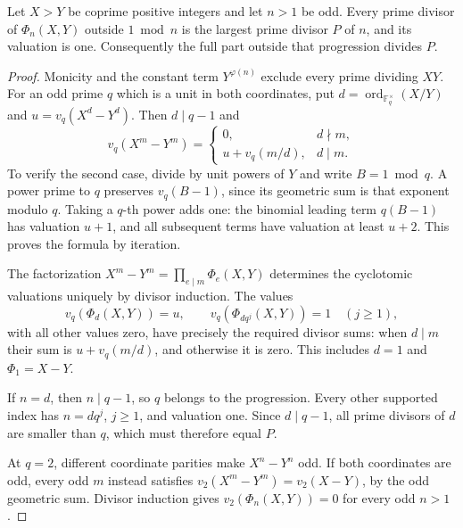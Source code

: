\begin{lemma}
\label{epg-cyclotomic-valuation}
Let $X>Y$ be coprime positive integers and let $n>1$ be odd.
Every prime divisor of $\Phi_n(X,Y)$ outside $1\bmod n$ is the
largest prime divisor $P$ of $n$, and its valuation is one.
Consequently the full part outside that progression divides $P$.
\end{lemma}
\begin{proof}
Monicity and the constant term $Y^{\varphi(n)}$ exclude every
prime dividing $XY$. For an odd prime $q$ which is a unit in both
coordinates, put $d=\operatorname{ord}_{\mathbb F_q^\times}(X/Y)$
and $u=v_q(X^d-Y^d)$. Then $d\mid q-1$ and
\[
 v_q(X^m-Y^m)=
 \begin{cases}
 0,&d\nmid m,\\
 u+v_q(m/d),&d\mid m.
 \end{cases}
\]
To verify the second case, divide by unit powers of $Y$ and write
$B=1\bmod q$. A power prime to $q$ preserves $v_q(B-1)$, since
its geometric sum is that exponent modulo $q$. Taking a $q$-th
power adds one: the binomial leading term $q(B-1)$ has valuation
$u+1$, and all subsequent terms have valuation at least $u+2$.
This proves the formula by iteration.

The factorization $X^m-Y^m=\prod_{e\mid m}\Phi_e(X,Y)$ determines
the cyclotomic valuations uniquely by divisor induction. The values
\[
 v_q(\Phi_d(X,Y))=u,\qquad
 v_q(\Phi_{dq^j}(X,Y))=1\quad(j\ge1),
\]
with all other values zero, have precisely the required divisor
sums: when $d\mid m$ their sum is $u+v_q(m/d)$, and otherwise
it is zero. This includes $d=1$ and $\Phi_1=X-Y$.

If $n=d$, then $n\mid q-1$, so $q$ belongs to the progression.
Every other supported index has $n=dq^j$, $j\ge1$, and valuation
one. Since $d\mid q-1$, all prime divisors of $d$ are smaller than
$q$, which must therefore equal $P$.

At $q=2$, different coordinate parities make $X^n-Y^n$ odd.
If both coordinates are odd, every odd $m$ instead satisfies
$v_2(X^m-Y^m)=v_2(X-Y)$, by the odd geometric sum. Divisor
induction gives $v_2(\Phi_n(X,Y))=0$ for every odd $n>1$.
\end{proof}

